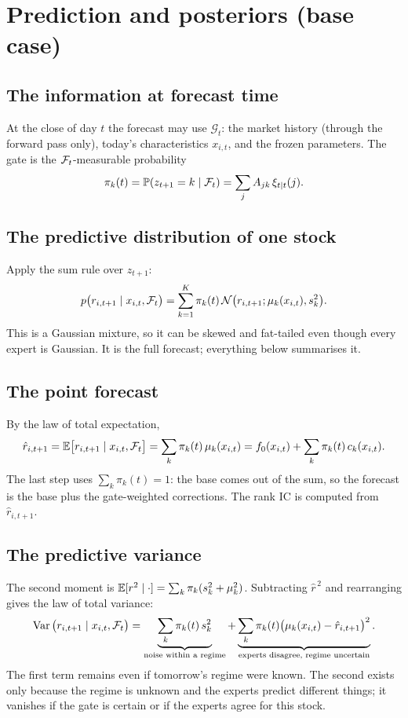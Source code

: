 \section{Prediction and posteriors (base case)}

\subsection{The information at forecast time}
At the close of day $t$ the forecast may use $\mathcal G_t$: the market history (through the forward pass only), today's characteristics $x_{i,t}$, and the frozen parameters. The gate is the $\mathcal{F}_t$-measurable probability
\begin{equation}
\pi_k(t)=\mathbb P(z_{t+1}=k\mid\mathcal{F}_t)=\sum_jA_{jk}\,\xi_{t\mid t}(j).
\end{equation}

\subsection{The predictive distribution of one stock}
Apply the sum rule over $z_{t+1}$:
\begin{equation}\label{eq:pred}
p\big(r_{i,t+1}\mid x_{i,t},\mathcal{F}_t\big)=\sum_{k=1}^K\pi_k(t)\,\mathcal{N}\big(r_{i,t+1};\mu_k(x_{i,t}),s_k^2\big).
\end{equation}
This is a Gaussian mixture, so it can be skewed and fat-tailed even though every expert is Gaussian. It is the full forecast; everything below summarises it.

\subsection{The point forecast}
By the law of total expectation,
\begin{equation}
\hat r_{i,t+1}=\mathbb{E}\big[r_{i,t+1}\mid x_{i,t},\mathcal{F}_t\big]=\sum_k\pi_k(t)\,\mu_k(x_{i,t})=f_0(x_{i,t})+\sum_k\pi_k(t)\,c_k(x_{i,t}).
\end{equation}
The last step uses $\sum_k\pi_k(t)=1$: the base comes out of the sum, so the forecast is the base plus the gate-weighted corrections. The rank IC is computed from $\hat r_{i,t+1}$.

\subsection{The predictive variance}
The second moment is $\mathbb{E}[r^2\mid\cdot]=\sum_k\pi_k(s_k^2+\mu_k^2)$. Subtracting $\hat r^{\,2}$ and rearranging gives the law of total variance:
\begin{equation}
\operatorname{Var}\big(r_{i,t+1}\mid x_{i,t},\mathcal{F}_t\big)=\underbrace{\sum_k\pi_k(t)\,s_k^2}_{\text{noise within a regime}}+\underbrace{\sum_k\pi_k(t)\big(\mu_k(x_{i,t})-\hat r_{i,t+1}\big)^2}_{\text{experts disagree, regime uncertain}}.
\end{equation}
The first term remains even if tomorrow's regime were known. The second exists only because the regime is unknown and the experts predict different things; it vanishes if the gate is certain or if the experts agree for this stock.

